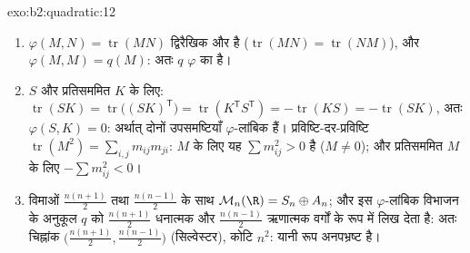 \begin{solution}{exo:b2:quadratic:12}
\begin{enumerate}
  \item $\varphi(M, N) = \operatorname{tr}(MN)$ द्विरैखिक और  है ($\operatorname{tr}(MN) =
        \operatorname{tr}(NM)$), और $\varphi(M, M) = q(M)$: अतः $q$ $\varphi$ का  है।
  \item {} $S$ और प्रतिसममित $K$ के लिए: $\operatorname{tr}(SK) =
        \operatorname{tr}\bigl((SK)^{\mathsf T}\bigr) =
        \operatorname{tr}(K^{\mathsf T}S^{\mathsf T}) =
        -\operatorname{tr}(KS) = -\operatorname{tr}(SK)$, अतः $\varphi(S, K) = 0$: अर्थात् दोनों
        उपसमष्टियाँ $\varphi$-लांबिक हैं। प्रविष्टि-दर-प्रविष्टि $\operatorname{tr}
        (M^2) = \sum_{i,j} m_{ij}m_{ji}$: 
        $M$ के लिए यह $\sum m_{ij}^2 > 0$ है ($M \neq 0$); और प्रतिसममित $M$ के लिए $-\sum m_{ij}^2 < 0$।
  \item विमाओं $\frac{n(n+1)}2$ तथा $\frac{n(n-1)}2$ के साथ $\mathcal M_n(\R) = S_n \oplus A_n$; और इस $\varphi$-लांबिक विभाजन के
        अनुकूल  $q$ को $\frac{n(n+1)}2$ धनात्मक और $\frac{n(n-1)}2$ ऋणात्मक वर्गों के
        रूप में लिख देता है: अतः चिह्नांक $\bigl(\frac{n(n+1)}2, \frac{n(n-1)}2\bigr)$ (सिल्वेस्टर), कोटि $n^2$:
        यानी रूप अनपभ्रष्ट है।
\end{enumerate}
\end{solution}

